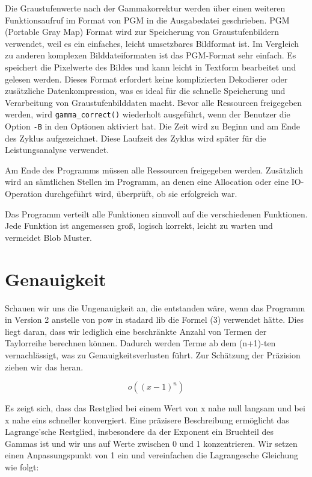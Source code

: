 \documentclass[course=erap]{aspdoc}
\begin{document}
\par
Die Graustufenwerte nach der Gammakorrektur werden über einen weiteren Funktionsaufruf im Format von PGM in die Ausgabedatei geschrieben. PGM (Portable Gray Map) Format\cite{netpbm} wird zur Speicherung von Graustufenbildern verwendet, weil es ein einfaches, leicht umsetzbares Bildformat ist. Im Vergleich zu anderen komplexen Bilddateiformaten ist das PGM-Format sehr einfach. Es speichert die Pixelwerte des Bildes und kann leicht in Textform bearbeitet und gelesen werden. Dieses Format erfordert keine komplizierten Dekodierer oder zusätzliche Datenkompression, was es ideal für die schnelle Speicherung und Verarbeitung von Graustufenbilddaten macht. Bevor alle Ressourcen freigegeben werden, wird \texttt{gamma\_correct()} wiederholt ausgeführt, wenn der Benutzer die Option \texttt{-B} in den Optionen aktiviert hat. Die Zeit wird zu Beginn und am Ende des Zyklus aufgezeichnet. Diese Laufzeit des Zyklus wird später für die Leistungsanalyse verwendet.

\par
Am Ende des Programms müssen alle Ressourcen freigegeben werden. Zusätzlich wird an sämtlichen Stellen im Programm, an denen eine Allocation oder eine IO-Operation durchgeführt wird, überprüft, ob sie erfolgreich war.

\par
Das Programm verteilt alle Funktionen sinnvoll auf die verschiedenen Funktionen. Jede Funktion ist angemessen groß, logisch korrekt, leicht zu warten und vermeidet Blob Muster.

\section{Genauigkeit}

\par
Schauen wir uns die Ungenauigkeit an, die entstanden wäre, wenn das Programm in Version 2 anstelle von pow in stadard lib die Formel (3) verwendet hätte. Dies liegt daran, dass wir lediglich eine beschränkte Anzahl von Termen der Taylorreihe berechnen können. Dadurch werden Terme ab dem (n+1)-ten vernachlässigt, was zu Genauigkeitsverlusten führt. Zur Schätzung der Präzision ziehen wir das \cite{mathematiknet2009taylorpolynome} heran.

\[
o\left((x-1)^n\right)
\]

\par
Es zeigt sich, dass das Restglied bei einem Wert von x nahe null langsam und bei x nahe eins schneller konvergiert. Eine präzisere Beschreibung ermöglicht das Lagrange'sche Restglied\cite{biancahoegel2021taylorformel}, insbesondere da der Exponent ein Bruchteil des Gammas ist und wir uns auf Werte zwischen 0 und 1 konzentrieren. Wir setzen einen Anpassungspunkt von 1 ein und vereinfachen die Lagrangesche Gleichung wie folgt:
\end{document}
